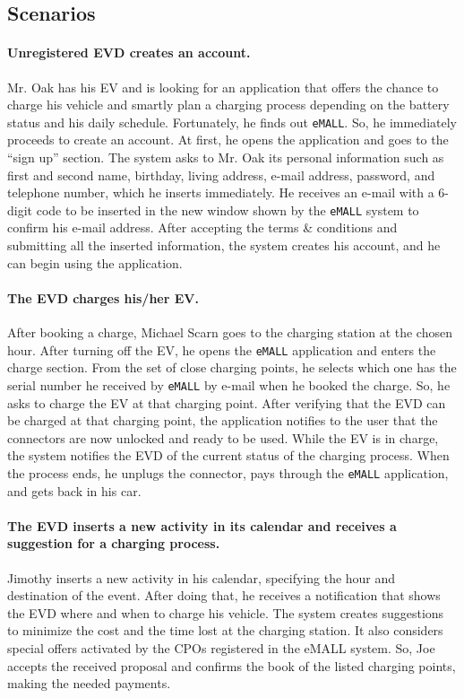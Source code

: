 \subsection{Scenarios}
\label{subsec:scenarios}%

\paragraph{Unregistered EVD creates an account.}
Mr. Oak has his EV and is looking for an application that offers the chance to charge his vehicle and smartly plan a
charging process depending on the battery status and his daily schedule.
Fortunately, he finds out \verb|eMALL|\@.
So, he immediately proceeds to create an account.
At first, he opens the application and goes to the ``sign up'' section.
The system asks to Mr. Oak its personal information such as first and second name, birthday, living address, e-mail address, password, and telephone number, which he inserts immediately.
He receives an e-mail with a 6-digit code to be inserted in the new window shown by the \verb|eMALL| system to confirm his e-mail address.
After accepting the terms \& conditions and submitting all the inserted information, the system creates his account,
and he can begin using the application.

\paragraph{The EVD charges his/her EV.}
After booking a charge, Michael Scarn goes to the charging station at the chosen hour.
After turning off the EV, he opens the \verb|eMALL| application and enters the charge section.
From the set of close charging points, he selects which one has the serial number he received by \verb|eMALL| by e-mail
when he booked the charge.
So, he asks to charge the EV at that charging point.
After verifying that the EVD can be charged at that charging point, the application notifies to the user that the
connectors are now unlocked and ready to be used.\@
While the EV is in charge, the system notifies the EVD of the current status of the charging process.
When the process ends, he unplugs the connector, pays through the \verb|eMALL| application, and gets back in his car.

\paragraph{The EVD inserts a new activity in its calendar and receives a suggestion for a charging process.}
Jimothy inserts a new activity in his calendar, specifying the hour and destination of the event.
After doing that, he receives a notification that shows the EVD where and when to charge his vehicle.
The system creates suggestions to minimize the cost and the time lost at the charging station.
It also considers special offers activated by the CPOs registered in the eMALL system.
So, Joe accepts the received proposal and confirms the book of the listed charging points, making the needed payments.

